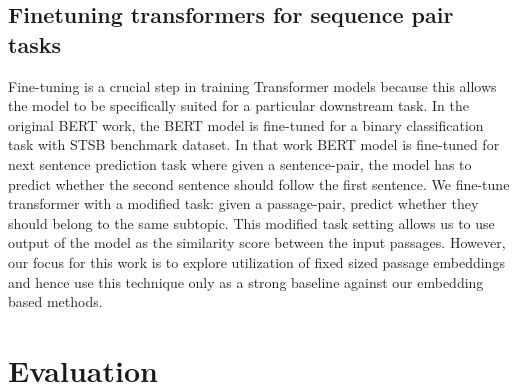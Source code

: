 \documentclass[sigconf,authordraft]{acmart}
\begin{document}
\subsection{Finetuning transformers for sequence pair tasks} Fine-tuning is a crucial step in training Transformer models because this allows the model to be specifically suited for a particular downstream task. In the original BERT work, the BERT model is fine-tuned for a binary classification task with STSB benchmark dataset. In that work BERT model is fine-tuned for next sentence prediction task where given a sentence-pair, the model has to predict whether the second sentence should follow the first sentence. We fine-tune transformer with a modified task: given a passage-pair, predict whether they should belong to the same subtopic. This modified task setting allows us to use output of the model as the similarity score between the input passages. However, our focus for this work is to explore utilization of fixed sized passage embeddings and hence use this technique only as a strong baseline against our embedding based methods.

\section{Evaluation} 
\end{document}

